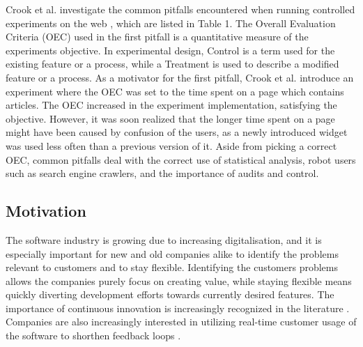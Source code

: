 \documentclass[english, grading]{tktltiki2}
\theoremstyle{definition}
\theoremstyle{remark}
\begin{document}
Crook et al. investigate the common pitfalls encountered when running controlled experiments on the web \cite{crook2009seven}, which are listed in Table 1. The Overall Evaluation Criteria (OEC) used in the first pitfall is a quantitative measure of the experiments objective. In experimental design, Control is a term used for the existing feature or a process, while a Treatment is used to describe a modified feature or a process. As a motivator for the first pitfall, Crook et al. introduce an experiment where the OEC was set to the time spent on a page which contains articles. The OEC increased in the experiment implementation, satisfying the objective. However, it was soon realized that the longer time spent on a page might have been caused by confusion of the users, as a newly introduced widget was used less often than a previous version of it. Aside from picking a correct OEC, common pitfalls deal with the correct use of statistical analysis, robot users such as search engine crawlers, and the importance of audits and control.

\subsection{Motivation}

The software industry is growing due to increasing digitalisation, and it is especially important for new and old companies alike to identify the problems relevant to customers and to stay flexible. Identifying the customers problems allows the companies purely focus on creating value, while staying flexible means quickly diverting development efforts towards currently desired features. The importance of continuous innovation is increasingly recognized in the literature \cite{steiber2013corporate}. Companies are also increasingly interested in utilizing real-time customer usage of the software to shorthen feedback loops \cite{olsson2012climbing}. 
\end{document}
